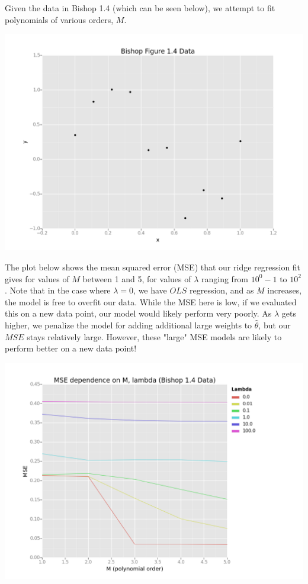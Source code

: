 \documentclass[10pt]{article}
\begin{document}
Given the data in Bishop 1.4 (which can be seen below), we attempt to fit polynomials of various orders, $M$. 

\begin{center}
\includegraphics[scale=.3]{Bishop_14_Data.png}
\end{center}

The plot below shows the mean squared error (MSE) that our ridge regression fit gives for values of $M$ between 1 and 5, for values of $\lambda$ ranging from $10^0 -1$ to $10^2$. Note that in the case where $\lambda = 0$, we have $OLS$ regression, and as $M$ increases, the model is free to overfit our data. While the MSE here is low, if we evaluated this on a new data point, our model would likely perform very poorly. As $\lambda$ gets higher, we penalize the model for adding additional large weights to $\hat{\theta}$, but our $MSE$ stays relatively large. However, these "large" MSE models are likely to perform better on a new data point!

\begin{center}
\includegraphics[scale=.4]{MSE_Lambda_Bishop.png}
\end{center}
\end{document}
